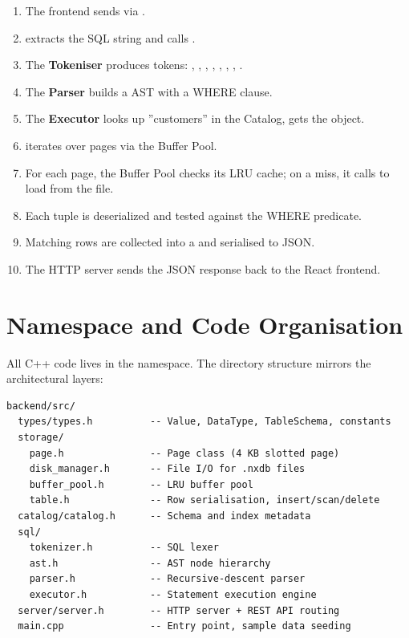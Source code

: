 \begin{deepdivebox}[Tracing \texttt{SELECT * FROM customers WHERE city = 'NYC'}]
\begin{enumerate}[nosep]
  \item The frontend sends  via .
  \item {} extracts the SQL string and calls .
  \item The \textbf{Tokeniser} produces tokens: , , , , , , , .
  \item The \textbf{Parser} builds a  AST with a  WHERE clause.
  \item The \textbf{Executor} looks up ''customers'' in the Catalog, gets the  object.
  \item {} iterates over pages via the Buffer Pool.
  \item For each page, the Buffer Pool checks its LRU cache; on a miss, it calls  to load from the  file.
  \item  Each tuple is deserialized and tested against the WHERE predicate.
  \item Matching rows are collected into a  and serialised to JSON.
  \item The HTTP server sends the JSON response back to the React frontend.
\end{enumerate}
\end{deepdivebox}

\section{Namespace and Code Organisation}

All C++ code lives in the  namespace.  The directory structure mirrors the architectural layers:

\begin{lstlisting}[style=pseudo, numbers=none]
backend/src/
  types/types.h          -- Value, DataType, TableSchema, constants
  storage/
    page.h               -- Page class (4 KB slotted page)
    disk_manager.h       -- File I/O for .nxdb files
    buffer_pool.h        -- LRU buffer pool
    table.h              -- Row serialisation, insert/scan/delete
  catalog/catalog.h      -- Schema and index metadata
  sql/
    tokenizer.h          -- SQL lexer
    ast.h                -- AST node hierarchy
    parser.h             -- Recursive-descent parser
    executor.h           -- Statement execution engine
  server/server.h        -- HTTP server + REST API routing
  main.cpp               -- Entry point, sample data seeding
\end{lstlisting}

